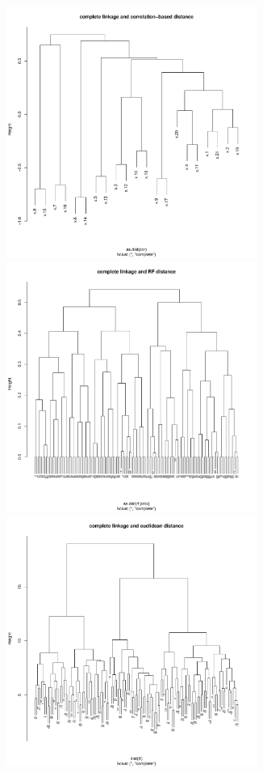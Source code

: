 \documentclass{article}
\begin{document}
\begin{figure}[h]				%
	\centering
	\includegraphics[width=8.2cm]{DA3/Plots/HCluster_complete_corr.pdf}
	\includegraphics[width=8.2cm]{DA3/Plots/HCluster_complete_RF.pdf}
	\includegraphics[width=8.2cm]{DA3/Plots/HCluster_complete_euclidean.pdf}
	\caption{}
\end{figure}
\end{document}
